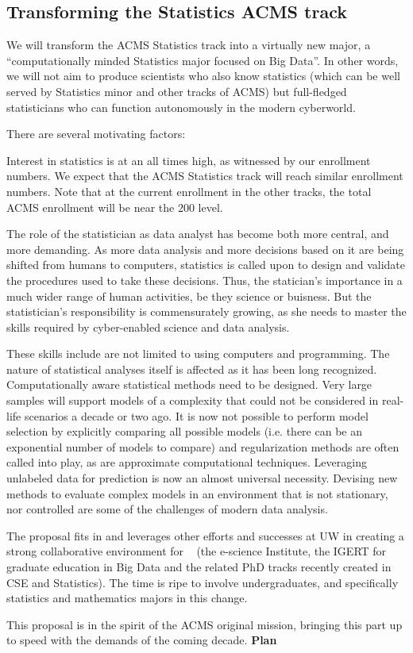 \subsection{Transforming the Statistics  ACMS track}
We will transform the ACMS Statistics track into a virtually new
major, a ``computationally minded Statistics major focused on Big Data''. 
In other words, we will not aim to produce scientists who also know statistics (which
can be well served by Statistics minor and other tracks of ACMS) but
full-fledged statisticians who can function autonomously in the modern
cyberworld.

There are several motivating factors:
\bit
\item Interest in statistics is at an all times high, as witnessed by
  our enrollment numbers. We expect that the ACMS Statistics track
  will reach similar enrollment numbers. Note that at the current
  enrollment in the other tracks, the total ACMS enrollment will be
  near the 200 level.

\item The role of
  the statistician as data analyst has become both more central, and
  more demanding. As more data analysis and more decisions based on it
  are being shifted from humans to computers, statistics is called
  upon to design and validate the procedures used to take these
  decisions. Thus, the statician's importance in a much wider range of
  human activities, be they science or buisness. But the
  statistician's responsibility is commensurately growing, as she needs
  to master the skills required by cyber-enabled science and data
  analysis.
\item These skills include are not limited to using computers and
  programming. The nature of statistical analyses itself is
  affected  as it has been long
  recognized. Computationally aware statistical methods need to be
  designed. Very large samples will support models of a complexity
  that could not be considered in real-life scenarios a decade or two
  ago. It is now not possible to perform model selection by explicitly
  comparing all possible models (i.e. there can be an exponential
  number of models to compare) and regularization methods are often
  called into play, as are approximate computational
  techniques. Leveraging unlabeled data for prediction is now an
  almost universal necessity. Devising new methods to evaluate complex
  models in an environment that is not stationary, nor controlled are
  some of the challenges of modern data analysis.
\item The proposal fits in and leverages other efforts and successes at UW in creating a strong collaborative environment for \cdse~ (the e-science Institute, the IGERT for graduate education in Big Data and the related PhD tracks recently created in CSE and Statistics). The time is ripe to involve undergraduates, and specifically statistics and mathematics majors in this change.
\item This proposal is in the spirit of the ACMS original mission,
  bringing this part up to speed with the demands of the coming decade.
\eit
{\bf Plan}

